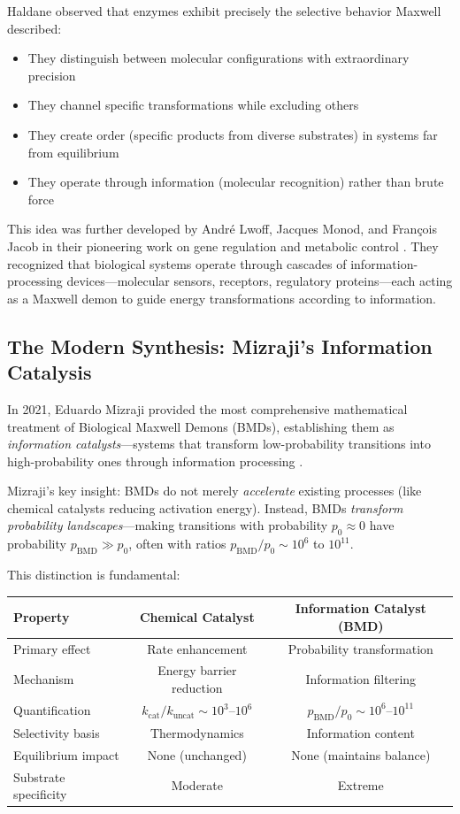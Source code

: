 Haldane observed that enzymes exhibit precisely the selective behavior Maxwell described:
\begin{itemize}
\item They distinguish between molecular configurations with extraordinary precision
\item They channel specific transformations while excluding others
\item They create order (specific products from diverse substrates) in systems far from equilibrium
\item They operate through information (molecular recognition) rather than brute force
\end{itemize}

This idea was further developed by André Lwoff, Jacques Monod, and François Jacob in their pioneering work on gene regulation and metabolic control \cite{monod1971chance,jacob1970logic}. They recognized that biological systems operate through cascades of information-processing devices—molecular sensors, receptors, regulatory proteins—each acting as a Maxwell demon to guide energy transformations according to information.

\subsection{The Modern Synthesis: Mizraji's Information Catalysis}

In 2021, Eduardo Mizraji provided the most comprehensive mathematical treatment of Biological Maxwell Demons (BMDs), establishing them as \textit{information catalysts}—systems that transform low-probability transitions into high-probability ones through information processing \cite{mizraji2021biological}.

Mizraji's key insight: BMDs do not merely \textit{accelerate} existing processes (like chemical catalysts reducing activation energy). Instead, BMDs \textit{transform probability landscapes}—making transitions with probability $p_0 \approx 0$ have probability $p_{\text{BMD}} \gg p_0$, often with ratios $p_{\text{BMD}}/p_0 \sim 10^6$ to $10^{11}$.

This distinction is fundamental:

\begin{center}
\begin{tabular}{lcc}
\toprule
\textbf{Property} & \textbf{Chemical Catalyst} & \textbf{Information Catalyst (BMD)} \\
\midrule
Primary effect & Rate enhancement & Probability transformation \\
Mechanism & Energy barrier reduction & Information filtering \\
Quantification & $k_{\text{cat}}/k_{\text{uncat}} \sim 10^3$--$10^6$ & $p_{\text{BMD}}/p_0 \sim 10^6$--$10^{11}$ \\
Selectivity basis & Thermodynamics & Information content \\
Equilibrium impact & None (unchanged) & None (maintains balance) \\
Substrate specificity & Moderate & Extreme \\
\bottomrule
\end{tabular}
\end{center}

